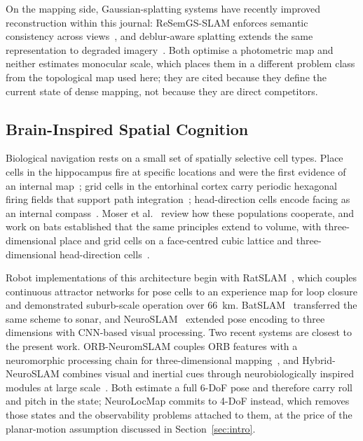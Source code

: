 On the mapping side, Gaussian-splatting systems have recently improved reconstruction within this journal: ReSemGS-SLAM enforces semantic consistency across views~\cite{zhao2026resemgs}, and deblur-aware splatting extends the same representation to degraded imagery~\cite{qin2025deblur}. Both optimise a photometric map and neither estimates monocular scale, which places them in a different problem class from the topological map used here; they are cited because they define the current state of dense mapping, not because they are direct competitors.

\subsection{Brain-Inspired Spatial Cognition}
\label{sec:related_bio}

Biological navigation rests on a small set of spatially selective cell types. Place cells in the hippocampus fire at specific locations and were the first evidence of an internal map~\cite{OKeefe1971}; grid cells in the entorhinal cortex carry periodic hexagonal firing fields that support path integration~\cite{Hafting2005}; head-direction cells encode facing as an internal compass~\cite{Taube1990}. Moser et al.~\cite{Moser2017} review how these populations cooperate, and work on bats established that the same principles extend to volume, with three-dimensional place and grid cells on a face-centred cubic lattice and three-dimensional head-direction cells~\cite{finkelstein2015three,finkelstein2016three}.

Robot implementations of this architecture begin with RatSLAM~\cite{milford2004ratslam,milford2008mapping}, which couples continuous attractor networks for pose cells to an experience map for loop closure and demonstrated suburb-scale operation over 66~km. BatSLAM~\cite{steckel2013batslam} transferred the same scheme to sonar, and NeuroSLAM~\cite{Yu2019} extended pose encoding to three dimensions with CNN-based visual processing. Two recent systems are closest to the present work. ORB-NeuromSLAM couples ORB features with a neuromorphic processing chain for three-dimensional mapping~\cite{shen2024orbneuro}, and Hybrid-NeuroSLAM combines visual and inertial cues through neurobiologically inspired modules at large scale~\cite{lu2025hybridneuro}. Both estimate a full 6-DoF pose and therefore carry roll and pitch in the state; NeuroLocMap commits to 4-DoF instead, which removes those states and the observability problems attached to them, at the price of the planar-motion assumption discussed in Section~\ref{sec:intro}.

